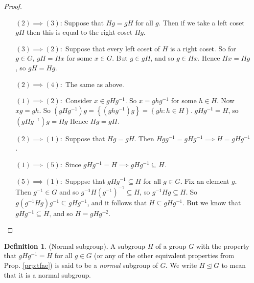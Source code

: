\documentclass{article}
\theoremstyle{definition} \newtheorem*{definition}{Definition}
\begin{document}
\begin{proof}\hfill \begin{itemize}

    \item[$(2) \implies (3)$:] Suppose that $Hg=gH$ for all $g$. Then if we
      take a left coset $gH$ then this is equal to the right coset $Hg$.

\item[$(3)\implies(2):$] Suppose that every left coset of $H$ is a right coset.
  So for $g \in G$, $gH=Hx$ for some $x \in G$. But $g \in gH$, and so $g \in
  Hx$. Hence $Hx=Hg$, so $gH=Hg$.

\item[$(2)\implies(4):$] The same as above.

\item[$(1)\implies(2):$] Consider $x \in gHg^{-1}$. So $x=ghg^{-1}$ for some $h
  \in H$. Now $xg=gh$. So $(gHg^{-1})g=\left\{ (ghg^{-1}) g \right\}=\left\{ gh
  : h \in H \right\}. $ $gHg^{-1}=H$, so $(gHg^{-1})g=Hg$ Hence $Hg = gH$.

\item[$(2)\implies(1):$] Suppose that $Hg=gH$. Then $Hgg^{-1}=gHg^{-1} \implies
  H=gHg^{-1}$.

\item[$(1) \implies (5):$] Since $gHg^{-1}=H \implies gHg^{-1} \subseteq H$.

\item[$(5) \implies (1):$] Supppse that $gHg^{-1}\subseteq H$ for all $g \in
  G$. Fix an element $g$. Then $g^{-1} \in G$ and so $g^{-1}H\left( g^{-1}
  \right)^{-1} \subseteq H$, so $g^{-1}Hg \subseteq H$. So $g\left( g^{-1}Hg
  \right)g^{-1} \subseteq gHg^{-1}$, and it follows that $H \subseteq
  gHg^{-1}$. But we know that $gHg^{-1} \subseteq H$, and so $H=gHg^{-2}$.
  \end{itemize} \end{proof}

\begin{definition}(Normal subgroup). A subgroup $H$ of a group $G$ with the property that
  $gHg^{-1}=H$ for all $g \in G$ (or any of the other equivalent properties
  from Prop. \ref{prp:tfae}) is said to be a \emph{normal} subgroup of $G$. We
  write $H \trianglelefteq G$ to mean that it is a normal subgroup.\\
\end{definition}
\end{document}
